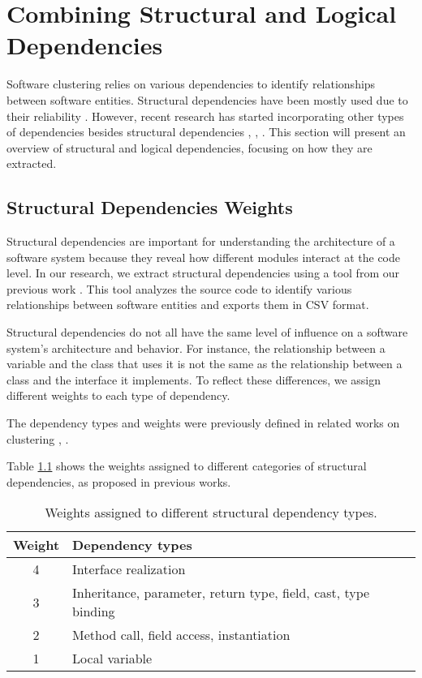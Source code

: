 \chapter{Combining Structural and Logical Dependencies}
\label{sec:combining}

Software clustering relies on various dependencies to identify relationships between software entities. Structural dependencies have been mostly used due to their reliability \cite{b12}. However, recent research has started incorporating other types of dependencies besides structural dependencies \cite{b13}, \cite{b14}, \cite{b18}. This section will present an overview of structural and logical dependencies, focusing on how they are extracted.

\section{Structural Dependencies Weights}

Structural dependencies are important for understanding the architecture of a software system because they reveal how different modules interact at the code level. In our research, we extract structural dependencies using a tool from our previous work \cite{b4}. This tool analyzes the source code to identify various relationships between software entities and exports them in CSV format.

Structural dependencies do not all have the same level of influence on a software system’s architecture and behavior. For instance, the relationship between a variable and the class that uses it is not the same as the relationship between a class and the interface it implements. To reflect these differences, we assign different weights to each type of dependency.

The dependency types and weights were previously defined in related works on clustering \cite{b19}, \cite{b20}.

Table \ref{tab:structural_weights} shows the weights assigned to different categories of structural dependencies, as proposed in previous works.

\begin{table}[htbp]
\centering
\begin{tabular}{|c|l|}
\hline
\textbf{Weight} & \textbf{Dependency types} \\
\hline
4 & Interface realization \\
3 & Inheritance, parameter, return type, field, cast, type binding \\
2 & Method call, field access, instantiation \\
1 & Local variable \\
\hline
\end{tabular}
\caption{Weights assigned to different structural dependency types. \cite{b20}}
\label{tab:structural_weights}
\end{table}

